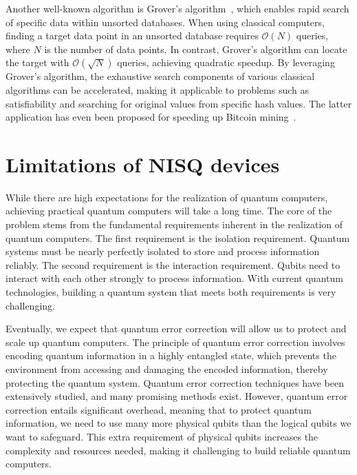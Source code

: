 \documentclass[12pt,dvipdfmx,twoside,openright]{report}
\begin{document}
Another well-known algorithm is Grover's algorithm~\cite{grover1996fast}, which enables rapid search of specific data within unsorted databases.
When using classical computers, finding a target data point in an unsorted database requires $\mathcal{O}(N)$ queries, where $N$ is the number of data points.
In contrast, Grover's algorithm can locate the target with $\mathcal{O}(\sqrt{N})$ queries, achieving quadratic speedup.
By leveraging Grover's algorithm, the exhaustive search components of various classical algorithms can be accelerated, making it applicable to problems such as satisfiability and searching for original values from specific hash values.
The latter application has even been proposed for speeding up Bitcoin mining~\cite{bitcoin}.




\section{Limitations of NISQ devices}
While there are high expectations for the realization of quantum computers, achieving practical quantum computers will take a long time.
The core of the problem stems from the fundamental requirements inherent in the realization of quantum computers.
The first requirement is the isolation requirement.
Quantum systems must be nearly perfectly isolated to store and process information reliably.
The second requirement is the interaction requirement.
Qubits need to interact with each other strongly to process information.
With current quantum technologies, building a quantum system that meets both requirements is very challenging.

Eventually, we expect that quantum error correction will allow us to protect and scale up quantum computers.
The principle of quantum error correction involves encoding quantum information in a highly entangled state, which prevents the environment from accessing and damaging the encoded information, thereby protecting the quantum system.
Quantum error correction techniques have been extensively studied, and many promising methods exist.
However, quantum error correction entails significant overhead, meaning that to protect quantum information, we need to use many more physical qubits than the logical qubits we want to safeguard.
This extra requirement of physical qubits increases the complexity and resources needed, making it challenging to build reliable quantum computers.
\end{document}

